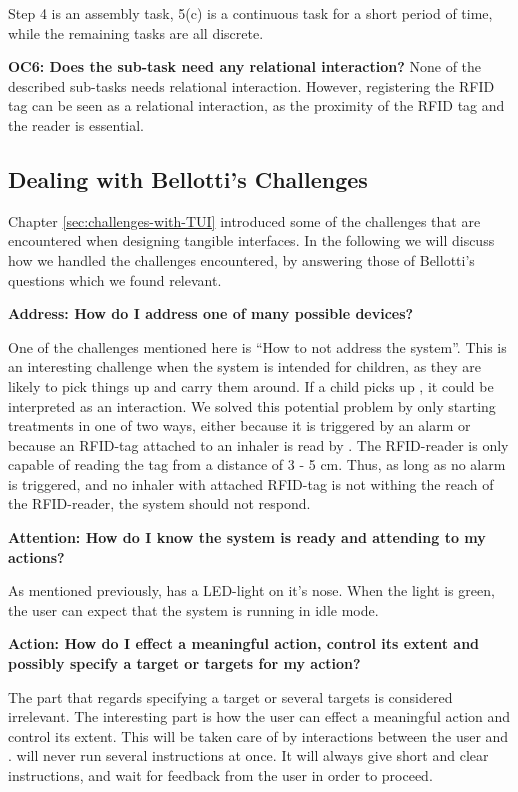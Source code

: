 Step 4 is an assembly task, 5(c) is a continuous task for a short period of time, while the remaining tasks are all discrete.  

\textbf{OC6: Does the sub-task need any relational interaction?}
None of the described sub-tasks needs relational interaction. However, registering the RFID tag can be seen as a relational interaction, as the proximity of the RFID tag and the reader is essential.  
 
\subsection{Dealing with Bellotti's Challenges}
\label{sec:dealingwithbellotti}

Chapter \ref{sec:challenges-with-TUI} introduced some of the challenges that are encountered when designing tangible interfaces. In the following we will discuss how we handled the challenges encountered, by answering those of Bellotti's questions which we found relevant. 

\textbf{Address: How do I address one of many possible devices?}

One of the challenges mentioned here is ``How to not address the system''. This is an interesting challenge when the system is intended for children, as they are likely to pick things up and carry them around. If a child picks up \ab{}, it could be interpreted as an interaction. We solved this potential problem by only starting treatments in one of two ways, either because it is triggered by an alarm or because an RFID-tag attached to an inhaler is read by \ab{}. The RFID-reader is only capable of reading the tag from a distance of 3 - 5 cm. Thus, as long as no alarm is triggered, and no inhaler with attached RFID-tag is not withing the reach of the RFID-reader, the system should not respond.  


\textbf{Attention: How do I know the system is ready and attending to my actions?}

As mentioned previously, \buddy{} has a LED-light on it's nose. When the light is green, the user can expect that the system is running in idle mode. 

\textbf{Action: How do I effect a meaningful action, control its extent and possibly specify a target or targets for my action?}

The part that regards specifying a target or several targets is considered irrelevant. The interesting part is how the user can effect a meaningful action and control its extent. This will be taken care of by interactions between the user and \buddy{}. \buddy{} will never run several instructions at once. It will always give short and clear instructions, and wait for feedback from the user in order to proceed. 

